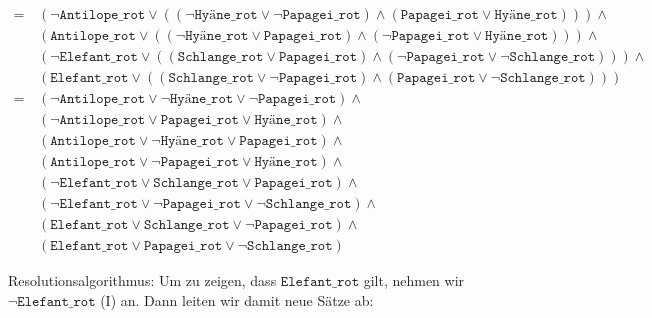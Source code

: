 \documentclass[a4paper,draft=false,oneside,12pt,ngerman]{scrreprt}
\begin{document}
\begin{align*}
        =\, & 
            (\neg \texttt{Antilope\_rot} \lor ( 
                (\neg \texttt{Hyäne\_rot} \lor \neg \texttt{Papagei\_rot}) \land
                (\texttt{Papagei\_rot} \lor \texttt{Hyäne\_rot})
            )) \land \\ &
            (\texttt{Antilope\_rot} \lor ( 
                (\neg\texttt{Hyäne\_rot} \lor \texttt{Papagei\_rot}) \land
                (\neg \texttt{Papagei\_rot} \lor \texttt{Hyäne\_rot})
            )) \land \\ &
            (\neg \texttt{Elefant\_rot} \lor (
                (\texttt{Schlange\_rot} \lor \texttt{Papagei\_rot}) \land
                (\neg \texttt{Papagei\_rot} \lor \neg \texttt{Schlange\_rot})
            )) \land \\ &
            (\texttt{Elefant\_rot} \lor ( 
                (\texttt{Schlange\_rot} \lor \neg \texttt{Papagei\_rot}) \land
                (\texttt{Papagei\_rot} \lor \neg \texttt{Schlange\_rot})
            )) \\
        =\, & 
            (\neg \texttt{Antilope\_rot} \lor \neg \texttt{Hyäne\_rot} \lor \neg \texttt{Papagei\_rot}) \land \tag{A} \\ &
            (\neg \texttt{Antilope\_rot} \lor \texttt{Papagei\_rot} \lor \texttt{Hyäne\_rot}) \land \tag{B} \\ &
            (\texttt{Antilope\_rot} \lor \neg\texttt{Hyäne\_rot} \lor \texttt{Papagei\_rot}) \land \tag{C} \\ &
            (\texttt{Antilope\_rot} \lor \neg \texttt{Papagei\_rot} \lor \texttt{Hyäne\_rot}) \land \tag{D} \\ &
            (\neg \texttt{Elefant\_rot} \lor \texttt{Schlange\_rot} \lor \texttt{Papagei\_rot}) \land \tag{E} \\ &
            (\neg \texttt{Elefant\_rot} \lor \neg \texttt{Papagei\_rot} \lor \neg \texttt{Schlange\_rot}) \land \tag{F} \\ &
            (\texttt{Elefant\_rot} \lor \texttt{Schlange\_rot} \lor \neg \texttt{Papagei\_rot}) \land \tag{G} \\ &
            (\texttt{Elefant\_rot} \lor \texttt{Papagei\_rot} \lor \neg \texttt{Schlange\_rot}) \tag{H}
\end{align*}

Resolutionsalgorithmus: Um zu zeigen, dass $ \texttt{Elefant\_rot} $ gilt, nehmen
wir $ \neg \texttt{Elefant\_rot} $ (I) an. Dann leiten wir damit neue Sätze ab:
\end{document}
